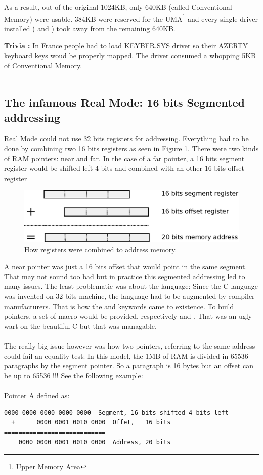 \documentclass[book.tex]{subfiles}
\begin{document}
As a result, out of the original 1024KB, only 640KB (called Conventional Memory) were usable. 384KB were reserved for the UMA\footnote{Upper Memory Area} and every single driver installed ( and )  took away from the remaining 640KB.

\bigskip

\textbf{\underline{Trivia :}}  In France people had to load KEYBFR.SYS driver so their AZERTY keyboard keys woud be properly mapped. The driver consumed a whopping 5KB of Conventional Memory.\\
\\

\subsection{The infamous Real Mode: 16 bits Segmented addressing}
Real Mode could not use 32 bits registers for addressing. Everything had to be done by combining two 16 bits registers as seen in Figure \ref{fig:register_comb_to_20_bits}. There were two kinds of RAM pointers: near and far. In the case of a far pointer, a 16 bits segment register would be shifted left 4 bits and combined with an other 16 bits offset register\\
\begin{figure}[H]
\centering
\includegraphics[scale=0.8]{imgs/register_combination_20_bits_address.eps}
\caption{How registers were combined to address memory.}
\label{fig:register_comb_to_20_bits}
\end{figure}
A near pointer was just a 16 bits offset that would point in the same segment. 
\bigskip
That may not sound too bad but in practice this segmented addressing led to many issues.
The least problematic was about the language: Since the C language was invented on 32 bits machine, the language had to be augmented by compiler manufacturers. That is how the  and  keywords came to existence. To build pointers, a set of macro would be provided, respectively  and . That was an ugly wart on the beautiful C but that was managable.\\
\\
The really big issue however was how two pointers, referring to the same address could fail an equality test: In this model, the 1MB of RAM is divided in 65536 paragraphs by the segment pointer. So a paragraph is 16 bytes but an offset can be up to 65536 !!! See the following example:\\
\bigskip
\\Pointer A defined as:
\begin{Verbatim}[fontsize=\relsize{-1}]
    0000 0000 0000 0000 0000  Segment, 16 bits shifted 4 bits left  
  +      0000 0001 0010 0000  Offet,   16 bits
============================
    0000 0000 0001 0010 0000  Address, 20 bits
\end{Verbatim}
\end{document}
